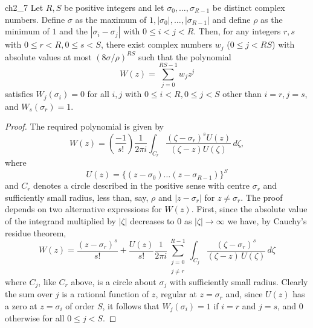 \begin{mylemma}{}{ch2_7}
Let $R, S$ be positive integers and let $\sigma_0, \dots, \sigma_{R-1}$ be distinct complex numbers. Define $\sigma$ as the maximum of $1, |\sigma_0|, \dots, |\sigma_{R-1}|$ and define $\rho$ as the minimum of $1$ and the $|\sigma_i - \sigma_j|$ with $0 \le i < j < R$. Then, for any integers $r, s$ with $0 \le r < R, 0 \le s < S$, there exist complex numbers $w_j$ ($0 \le j < RS$) with absolute values at most $(8\sigma/\rho)^{RS}$ such that the polynomial
\[
W(z) = \sum_{j=0}^{RS-1} w_j z^j
\]
satisfies $W_j(\sigma_i) = 0$ for all $i, j$ with $0 \le i < R, 0 \le j < S$ other than $i=r, j=s$, and $W_s(\sigma_r) = 1$.
\end{mylemma}

\begin{proof}
The required polynomial is given by
\[
W(z) = \left(\frac{-1}{s!}\right) \frac{1}{2\pi i} \int_{C_r} \frac{(\zeta - \sigma_r)^s U(z)}{(\zeta - z) U(\zeta)} \, d\zeta,
\]
where
\[
U(z) = \{(z - \sigma_0) \dots (z - \sigma_{R-1})\}^S
\]
and $C_r$ denotes a circle described in the positive sense with centre $\sigma_r$ and sufficiently small radius, less than, say, $\rho$ and $|z - \sigma_r|$ for $z \neq \sigma_r$. The proof depends on two alternative expressions for $W(z)$. First, since the absolute value of the integrand multiplied by $|\zeta|$ decreases to $0$ as $|\zeta| \to \infty$ we have, by Cauchy's residue theorem,
\[
W(z) = \frac{(z-\sigma_r)^s}{s!} + \frac{U(z)}{s!} \frac{1}{2\pi i} \sum_{\substack{j=0\\j\neq r}}^{R-1} \int_{C_j} \frac{(\zeta-\sigma_r)^s}{(\zeta-z) \, U(\zeta)} \, d\zeta
\]
where $C_j$, like $C_r$ above, is a circle about $\sigma_j$ with sufficiently small radius. Clearly the sum over $j$ is a rational function of $z$, regular at $z = \sigma_r$ and, since $U(z)$ has a zero at $z = \sigma_i$ of order $S$, it follows that $W_j(\sigma_i) = 1$ if $i = r$ and $j = s$, and $0$ otherwise for all $0 \le j < S$.


\end{proof}
